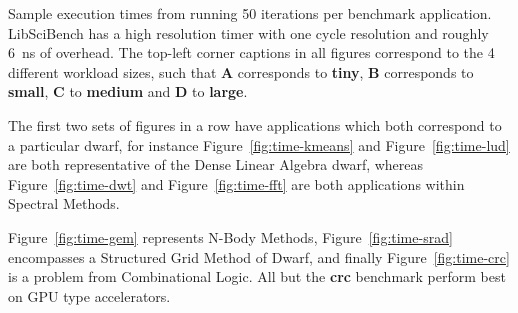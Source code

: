 \documentclass[../document.tex]{subfiles}
\begin{document}
Sample execution times from running 50 iterations per benchmark application.
LibSciBench has a high resolution timer with one cycle resolution and roughly \SI{6}{\nano\second} of overhead.
The top-left corner captions in all figures correspond to the 4 different workload sizes, such that {\bf A} corresponds to {\bf tiny}, {\bf B} corresponds to {\bf small}, {\bf C} to {\bf medium} and {\bf D} to {\bf large}.

The first two sets of figures in a row have applications which both correspond to a particular dwarf, for instance Figure~\ref{fig:time-kmeans} and Figure~\ref{fig:time-lud} are both representative of the Dense Linear Algebra dwarf, whereas Figure~\ref{fig:time-dwt} and Figure~\ref{fig:time-fft} are both applications within Spectral Methods.

Figure~\ref{fig:time-gem} represents N-Body Methods, Figure~\ref{fig:time-srad} encompasses a Structured Grid Method of Dwarf, and finally Figure~\ref{fig:time-crc} is a problem from Combinational Logic.
All but the {\bf crc} benchmark perform best on GPU type accelerators.

\end{document}
